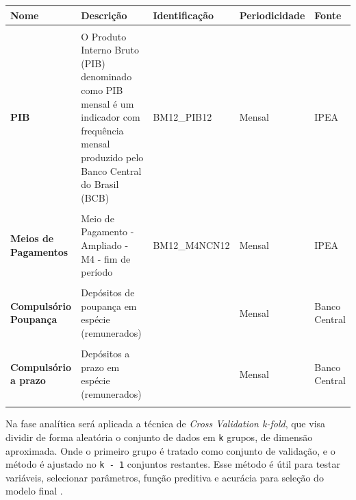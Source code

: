 \documentclass[12pt,12pt,openright,oneside,a4paper,chapter=TITLE,section=TITLE,subsection=TITLE,subsubsection=TITLE,english,french,spanish,portugues,sumario=tradicional]{abntex2}
\begin{document}
\begin{table}[H]
\begin{tabular}[t]{>{\raggedright\arraybackslash}p{2cm}>{\raggedright\arraybackslash}p{4cm}>{\raggedright\arraybackslash}p{2cm}>{\raggedright\arraybackslash}p{2cm}>{\raggedright\arraybackslash}p{2cm}}
\toprule
Nome & Descrição & Identificação & Periodicidade & Fonte\\
\midrule
\textbf{\cellcolor{gray!6}{Demonstrações Financeiras}} & \cellcolor{gray!6}{Balancetes (IFs e Conglomerados)} & \cellcolor{gray!6}{370} & \cellcolor{gray!6}{Mensal} & \cellcolor{gray!6}{Banco Central}\\
\textbf{PIB} & O Produto Interno Bruto (PIB) denominado como PIB mensal é um indicador com frequência mensal produzido pelo Banco Central do Brasil (BCB) & BM12\_PIB12 & Mensal & IPEA\\
\textbf{\cellcolor{gray!6}{Selic Over}} & \cellcolor{gray!6}{Taxa de juros apurada nas operações de empréstimos de um dia entre as instituições financeiras que utilizam títulos públicos federais como garantia} & \cellcolor{gray!6}{BM12\_TJOVER12} & \cellcolor{gray!6}{Mensal} & \cellcolor{gray!6}{Banco Central}\\
\textbf{Meios de Pagamentos} & Meio de Pagamento - Ampliado - M4 - fim de período & BM12\_M4NCN12 & Mensal & IPEA\\
\textbf{\cellcolor{gray!6}{IPCA}} & \cellcolor{gray!6}{IPCA Geral} & \cellcolor{gray!6}{PRECOS12\_IPCAG12} & \cellcolor{gray!6}{Mensal} & \cellcolor{gray!6}{IPEA}\\
\addlinespace
\textbf{Compulsório Poupança} & Depósitos de poupança em espécie (remunerados) & 1848 & Mensal & Banco Central\\
\textbf{\cellcolor{gray!6}{Compulsório a vista}} & \cellcolor{gray!6}{Recursos a vista em espécie (não remunerados)} & \cellcolor{gray!6}{1849} & \cellcolor{gray!6}{Mensal} & \cellcolor{gray!6}{Banco Central}\\
\textbf{Compulsório a prazo} & Depósitos a prazo em espécie (remunerados) & 1850 & Mensal & Banco Central\\
\textbf{\cellcolor{gray!6}{Base Monetária Ampliada}} & \cellcolor{gray!6}{Base Monetária Ampliada (saldo em final de período)} & \cellcolor{gray!6}{1833} & \cellcolor{gray!6}{Mensal} & \cellcolor{gray!6}{Banco Central}\\
\bottomrule
\end{tabular}
\endgroup{}
\end{table}

Na fase analítica será aplicada a técnica de \emph{Cross Validation k-fold}, que visa dividir de forma aleatória o conjunto de dados em \texttt{k} grupos, de dimensão aproximada. Onde o primeiro grupo é tratado como conjunto de validação, e o método é ajustado no \texttt{k\ -\ 1} conjuntos restantes. Esse método é útil para testar variáveis, selecionar parâmetros, função preditiva e acurácia para seleção do modelo final \cite{gareth:2017}.
\end{document}
